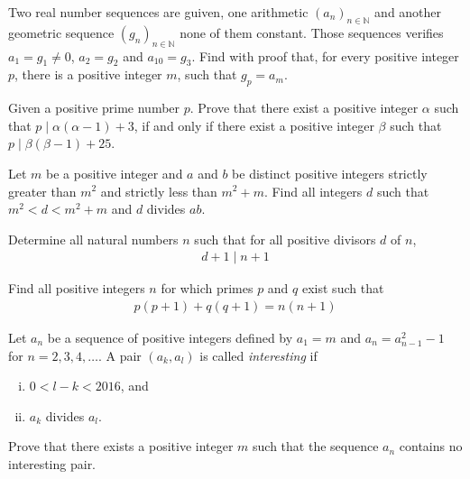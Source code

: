 \documentclass[problems.tex]{subfile}
\begin{document}
	\begin{problem}
		Two real number sequences are guiven, one arithmetic $\left(a_n\right)_{n\in \mathbb {N}}$ and another geometric sequence $\left(g_n\right)_{n\in \mathbb {N}}$ none of them constant. Those sequences verifies $a_1=g_1\neq 0$, $a_2=g_2$ and $a_{10}=g_3$. Find with proof that, for every positive integer $p$, there is a positive integer $m$, such that $g_p=a_m$. %
	\end{problem}



	\begin{problem}
		Given a positive prime number $p$. Prove that there exist a positive integer $\alpha$ such that $p\mid \alpha(\alpha-1)+3$, if and only if there exist a positive integer $\beta$ such that $p\mid \beta(\beta-1)+25$. %
	\end{problem}



	\begin{problem}
		Let $m$ be a positive integer and $a$ and $b$ be distinct positive integers strictly greater than $m^2$ and strictly less than $m^2+m$. Find all integers $d$ such that $m^2 < d < m^2+m$ and $d$ divides $ab$. %
	\end{problem}




	\begin{problem}
		Determine all natural numbers $n$ such that for all positive divisors $d$ of $n$,
		\begin{align*}
			d + 1 \mid n + 1
		\end{align*}
	\end{problem}



	\begin{problem}
		Find all positive integers $n$ for which primes $p$ and $q$ exist such that
		\begin{align*}
			p(p+1) + q(q+1) = n(n+1)
		\end{align*}
	\end{problem}


	\begin{problem}
		Let $a_n$ be a sequence of positive integers defined by $a_1 = m$ and $a_{n} = a_{n-1}^2 - 1$ for $n= 2, 3, 4, \dots$. A pair $(a_k, a_l)$ is called \textit{interesting} if
		\begin{enumerate}[(i)]
			\item $0 < l - k < 2016$, and
			\item $a_k$ divides $a_l$.
		\end{enumerate}
		Prove that there exists a positive integer $m$ such that the sequence $a_n$ contains no interesting pair.
	\end{problem}
\end{document}
